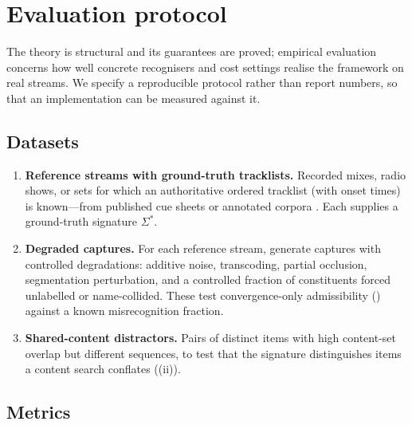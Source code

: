 \documentclass[11pt,twocolumn,a4paper]{article}
\theoremstyle{thmstyle}
\theoremstyle{definition}
\theoremstyle{remark}
\newcommand{\sig}{\Sigma}
\begin{document}

\section{Evaluation protocol}
\label{sec:evaluation}

The theory is structural and its guarantees are proved; empirical evaluation
concerns how well concrete recognisers and cost settings realise the framework on
real streams. We specify a reproducible protocol rather than report numbers, so
that an implementation can be measured against it.

\subsection{Datasets}

\begin{enumerate}[leftmargin=1.4em,itemsep=2pt]
\item \textbf{Reference streams with ground-truth tracklists.} Recorded mixes,
radio shows, or sets for which an authoritative ordered tracklist (with onset
times) is known---from published cue sheets or annotated corpora
\citep{schwarz2018dj,sonnleitner2016landmark}. Each supplies a ground-truth
signature $\sig^{\ast}$.
\item \textbf{Degraded captures.} For each reference stream, generate captures
with controlled degradations: additive noise, transcoding, partial occlusion,
segmentation perturbation, and a controlled fraction of constituents forced
unlabelled or name-collided. These test convergence-only admissibility
() against a known misrecognition fraction.
\item \textbf{Shared-content distractors.} Pairs of distinct items with high
content-set overlap but different sequences, to test that the signature
distinguishes items a content search conflates ((ii)).
\end{enumerate}

\subsection{Metrics}
\end{document}
